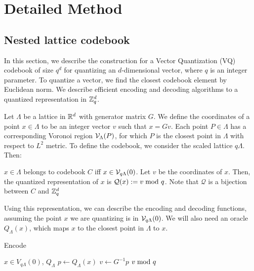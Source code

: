 \section{Detailed Method}\label{sec:details}

\subsection{Nested lattice codebook}

In this section, we describe the construction for a Vector Quantization (VQ) codebook of size $q^d$ for quantizing an $d$-dimensional vector, where $q$ is an integer parameter. To quantize a vector, we find the closest codebook element by Euclidean norm. We describe efficient encoding and decoding algorithms to a quantized representation in $\mathbb{Z}_q^d$.

Let $\Lambda$ be a lattice in $\mathbb{R}^d$ with generator matrix $G$. We define the coordinates of a point $x \in \Lambda$ to be an integer vector $v$ such that $x = Gv$. Each point $P \in \Lambda$ has a corresponding Voronoi region $\mathcal{V}_\Lambda(P)$, for which $P$ is the closest point in $\Lambda$ with respect to $L^2$ metric. To define the codebook, we consider the scaled lattice $q\Lambda$. Then:

\begin{definition}
    $x \in \Lambda$ belongs to codebook $C$ iff $x \in \mathcal{V}_{q\Lambda}(0)$. Let $v$ be the coordinates of $x$. Then, the quantized representation of $x$ is $\mathcal{Q}(x) := v \; \mathrm{mod}\ q$. Note that $\mathcal{Q}$ is a bijection between $C$ and $\mathbb{Z}_q^d$
\end{definition}

Using this representation, we can describe the encoding and decoding functions, assuming the point $x$ we are quantizing is in $\mathcal{V}_{q\Lambda}(0)$. We will also need an oracle $Q_{\Lambda}(x)$, which maps $x$ to the closest point in $\Lambda$ to $x$.

\begin{algorithm}[h]
   \caption{Encode}
   \label{alg:encode}
\begin{algorithmic}
    $x \in V_{q\Lambda}(0)$, $Q_{\Lambda}$
   \State $p \leftarrow Q_{\Lambda}(x)$
   \State $v \leftarrow G^{-1}p$ 
    {$v \; \mathrm{mod}\ q$} 
\end{algorithmic}
\end{algorithm}




